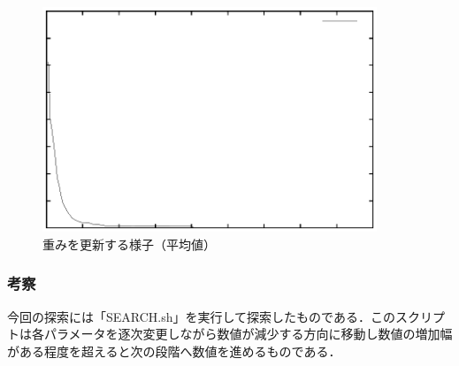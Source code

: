 \begin{figure}[h]
 \begin{center}
  \includegraphics[width=10.0cm]{level3/data.eps}
  \caption{重みを更新する様子（平均値）}
  \label{dataplot}
 \end{center}
\end{figure} 


\subsubsection{考察}
今回の探索には「SEARCH.sh」を実行して探索したものである．このスクリプトは各パラメータを逐次変更しながら数値が減少する方向に移動し数値の増加幅がある程度を超えると次の段階へ数値を進めるものである．
